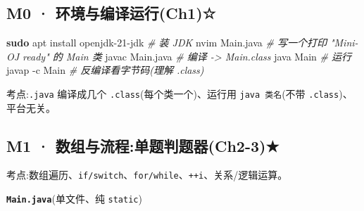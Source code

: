 \documentclass[
  11pt,
]{ctexart}
\newenvironment{Shaded}{\begin{snugshade}}{\end{snugshade}}
\newcommand{\AttributeTok}[1]{\textcolor[rgb]{0.13,0.29,0.53}{#1}}
\newcommand{\CommentTok}[1]{\textcolor[rgb]{0.56,0.35,0.01}{\textit{#1}}}
\newcommand{\ExtensionTok}[1]{#1}
\newcommand{\FunctionTok}[1]{\textcolor[rgb]{0.13,0.29,0.53}{\textbf{#1}}}
\newcommand{\NormalTok}[1]{#1}
\begin{document}
\hypertarget{m0-ux73afux5883ux4e0eux7f16ux8bd1ux8fd0ux884cch1}{%
\subsection{M0 ·
环境与编译运行(Ch1)☆}\label{m0-ux73afux5883ux4e0eux7f16ux8bd1ux8fd0ux884cch1}}

\begin{Shaded}
\begin{Highlighting}[]
\FunctionTok{sudo}\NormalTok{ apt install openjdk{-}21{-}jdk      }\CommentTok{\# 装 JDK}
\ExtensionTok{nvim}\NormalTok{ Main.java                       }\CommentTok{\# 写一个打印 "Mini{-}OJ ready" 的 Main 类}
\ExtensionTok{javac}\NormalTok{ Main.java                      }\CommentTok{\# 编译 {-}\textgreater{} Main.class}
\ExtensionTok{java}\NormalTok{ Main                            }\CommentTok{\# 运行}
\ExtensionTok{javap} \AttributeTok{{-}c}\NormalTok{ Main                        }\CommentTok{\# 反编译看字节码(理解 .class)}
\end{Highlighting}
\end{Shaded}

考点:\texttt{.java} 编译成几个 \texttt{.class}(每个类一个)、运行用
\texttt{java\ 类名}(不带 \texttt{.class})、平台无关。

\hypertarget{m1-ux6570ux7ec4ux4e0eux6d41ux7a0bux5355ux9898ux5224ux9898ux5668ch2-3}{%
\subsection{M1 ·
数组与流程:单题判题器(Ch2-3)★}\label{m1-ux6570ux7ec4ux4e0eux6d41ux7a0bux5355ux9898ux5224ux9898ux5668ch2-3}}

考点:数组遍历、\texttt{if/switch}、\texttt{for/while}、\texttt{++i}、关系/逻辑运算。

\textbf{\texttt{Main.java}}(单文件、纯 \texttt{static})
\end{document}
